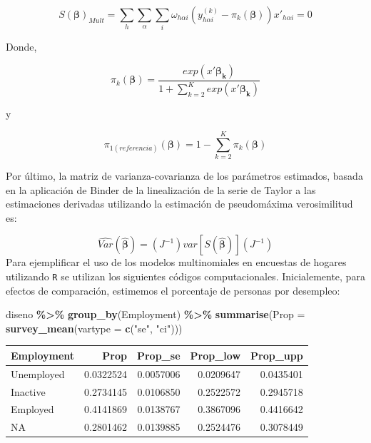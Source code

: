 \documentclass[
  12pt,
]{book}
\newenvironment{Shaded}{\begin{snugshade}}{\end{snugshade}}
\newcommand{\AttributeTok}[1]{\textcolor[rgb]{0.13,0.29,0.53}{#1}}
\newcommand{\FunctionTok}[1]{\textcolor[rgb]{0.13,0.29,0.53}{\textbf{#1}}}
\newcommand{\NormalTok}[1]{#1}
\newcommand{\SpecialCharTok}[1]{\textcolor[rgb]{0.81,0.36,0.00}{\textbf{#1}}}
\newcommand{\StringTok}[1]{\textcolor[rgb]{0.31,0.60,0.02}{#1}}
\begin{document}
\[
S\left(\boldsymbol{\beta}\right)_{Mult}  =  \sum_{h}\sum_{\alpha}\sum_{i}\omega_{h\alpha i}\left(y_{h\alpha i}^{\left(k\right)}-\pi_{k}\left(\boldsymbol{\beta}\right)\right)x'_{h\alpha i}=0
\]

Donde,

\[
\pi_{k}\left(\boldsymbol{\beta}\right)=\frac{exp\left(x'\boldsymbol{\beta_{k}}\right)}{1+{ \sum_{k=2}^{K}exp\left(x'\boldsymbol{\beta_{k}}\right)}}
\]

y

\[
\pi_{1\left(referencia\right)}\left(\boldsymbol{\beta}\right)=1-\sum_{k=2}^{K}\pi_{k}\left(\boldsymbol{\beta}\right)
\]

Por último, la matriz de varianza-covarianza de los parámetros estimados, basada en la aplicación de Binder de la linealización de la serie de Taylor a las estimaciones derivadas utilizando la estimación de pseudomáxima verosimilitud es:

\[
\hat{Var}\left(\hat{\boldsymbol{\beta}}\right)  =  \left(J^{-1}\right)var\left[S\left(\hat{\boldsymbol{\beta}}\right)\right]\left(J^{-1}\right)
\]
Para ejemplificar el uso de los modelos multinomiales en encuestas de hogares utilizando \texttt{R} se utilizan los siguientes códigos computacionales. Inicialemente, para efectos de comparación, estimemos el porcentaje de personas por desempleo:

\begin{Shaded}
\begin{Highlighting}[]
\NormalTok{diseno }\SpecialCharTok{\%\textgreater{}\%} \FunctionTok{group\_by}\NormalTok{(Employment) }\SpecialCharTok{\%\textgreater{}\%} 
  \FunctionTok{summarise}\NormalTok{(}\AttributeTok{Prop =} \FunctionTok{survey\_mean}\NormalTok{(}\AttributeTok{vartype =} \FunctionTok{c}\NormalTok{(}\StringTok{"se"}\NormalTok{, }\StringTok{"ci"}\NormalTok{)))}
\end{Highlighting}
\end{Shaded}

\begin{tabular}{l|r|r|r|r}
\hline
Employment & Prop & Prop\_se & Prop\_low & Prop\_upp\\
\hline
Unemployed & 0.0322524 & 0.0057006 & 0.0209647 & 0.0435401\\
\hline
Inactive & 0.2734145 & 0.0106850 & 0.2522572 & 0.2945718\\
\hline
Employed & 0.4141869 & 0.0138767 & 0.3867096 & 0.4416642\\
\hline
NA & 0.2801462 & 0.0139885 & 0.2524476 & 0.3078449\\
\hline
\end{tabular}
\end{document}
